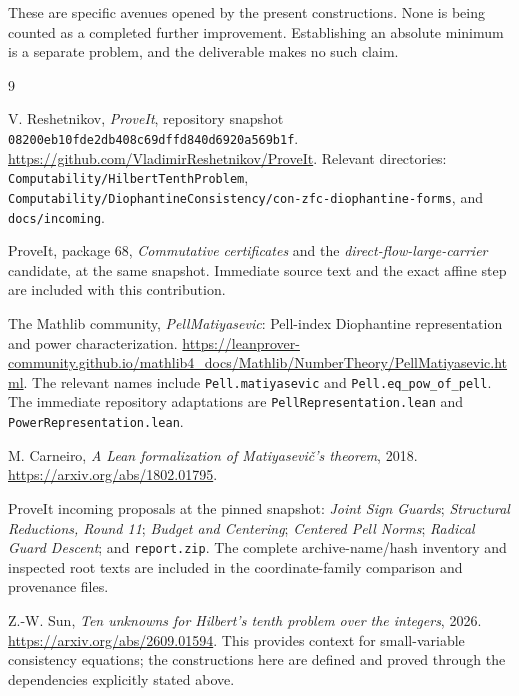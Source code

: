 \documentclass[11pt,letterpaper]{article}
\newcommand{\file}[1]{\nolinkurl{#1}}
\newcommand{\pin}{\texttt{08200eb10fde2db408c69dffd840d6920a569b1f}}
\begin{document}
These are specific avenues opened by the present constructions. None is
being counted as a completed further improvement. Establishing an absolute
minimum is a separate problem, and the deliverable makes no such claim.

\clearpage
\begin{thebibliography}{9}
\raggedright
{}
V. Reshetnikov, \emph{ProveIt}, repository snapshot
\pin.\\
\url{https://github.com/VladimirReshetnikov/ProveIt}.
Relevant directories: \file{Computability/HilbertTenthProblem},
\file{Computability/DiophantineConsistency/con-zfc-diophantine-forms},
and \file{docs/incoming}.

ProveIt, package 68, \emph{Commutative certificates} and the
\emph{direct-flow-large-carrier} candidate, at the same snapshot.
Immediate source text and the exact affine step are included with this
contribution.

The Mathlib community, \emph{PellMatiyasevic}: Pell-index
Diophantine representation and power characterization.
\url{https://leanprover-community.github.io/mathlib4_docs/Mathlib/NumberTheory/PellMatiyasevic.html}.
The relevant names include \file{Pell.matiyasevic} and
\file{Pell.eq_pow_of_pell}. The immediate repository adaptations are
\file{PellRepresentation.lean} and \file{PowerRepresentation.lean}.

M. Carneiro, \emph{A Lean formalization of Matiyasevi\v{c}'s theorem},
2018. \url{https://arxiv.org/abs/1802.01795}.

ProveIt incoming proposals at the pinned snapshot:
\emph{Joint Sign Guards}; \emph{Structural Reductions, Round 11};
\emph{Budget and Centering}; \emph{Centered Pell Norms};
\emph{Radical Guard Descent}; and \file{report.zip}.
The complete archive-name/hash inventory and inspected root texts are
included in the coordinate-family comparison and provenance files.

Z.-W. Sun, \emph{Ten unknowns for Hilbert's tenth problem over the
integers}, 2026. \url{https://arxiv.org/abs/2609.01594}.
This provides context for small-variable consistency equations;
the constructions here are defined and proved through the dependencies
explicitly stated above.
\end{thebibliography}
\end{document}
